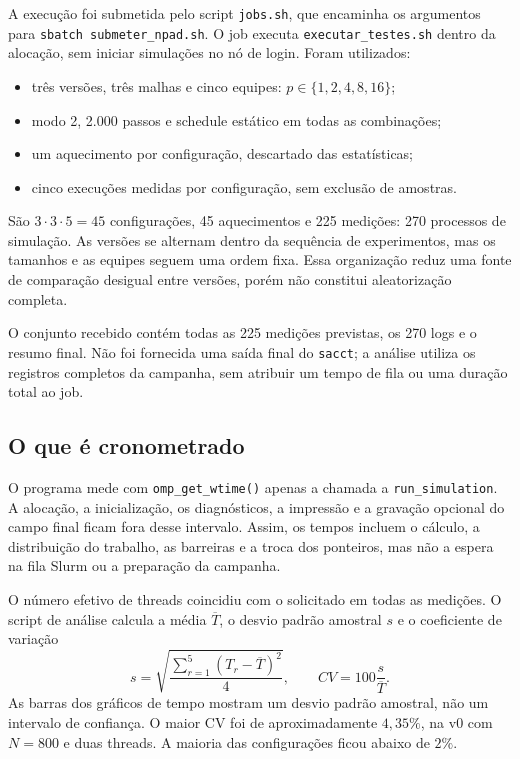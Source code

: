 \documentclass[12pt,a4paper]{article}
\begin{document}
A execução foi submetida pelo script \texttt{jobs.sh}, que encaminha os argumentos para \texttt{sbatch submeter\_npad.sh}. O job executa \texttt{executar\_testes.sh} dentro da alocação, sem iniciar simulações no nó de login. Foram utilizados:
\begin{itemize}
\item três versões, três malhas e cinco equipes: $p\in\{1,2,4,8,16\}$;
\item modo 2, 2.000 passos e schedule estático em todas as combinações;
\item um aquecimento por configuração, descartado das estatísticas;
\item cinco execuções medidas por configuração, sem exclusão de amostras.
\end{itemize}
São $3\cdot3\cdot5=45$ configurações, 45 aquecimentos e 225 medições: 270 processos de simulação. As versões se alternam dentro da sequência de experimentos, mas os tamanhos e as equipes seguem uma ordem fixa. Essa organização reduz uma fonte de comparação desigual entre versões, porém não constitui aleatorização completa.

O conjunto recebido contém todas as 225 medições previstas, os 270 logs e o resumo final. Não foi fornecida uma saída final do \texttt{sacct}; a análise utiliza os registros completos da campanha, sem atribuir um tempo de fila ou uma duração total ao job.

\subsection{O que é cronometrado}
O programa mede com \texttt{omp\_get\_wtime()} apenas a chamada a \texttt{run\_simulation}. A alocação, a inicialização, os diagnósticos, a impressão e a gravação opcional do campo final ficam fora desse intervalo. Assim, os tempos incluem o cálculo, a distribuição do trabalho, as barreiras e a troca dos ponteiros, mas não a espera na fila Slurm ou a preparação da campanha.

O número efetivo de threads coincidiu com o solicitado em todas as medições. O script de análise calcula a média $\overline T$, o desvio padrão amostral $s$ e o coeficiente de variação
\[
s=\sqrt{\frac{\sum_{r=1}^{5}(T_r-\overline T)^2}{4}},
\qquad CV=100\frac{s}{\overline T}.
\]
As barras dos gráficos de tempo mostram um desvio padrão amostral, não um intervalo de confiança. O maior CV foi de aproximadamente $4{,}35\%$, na v0 com $N=800$ e duas threads. A maioria das configurações ficou abaixo de $2\%$.
\end{document}

